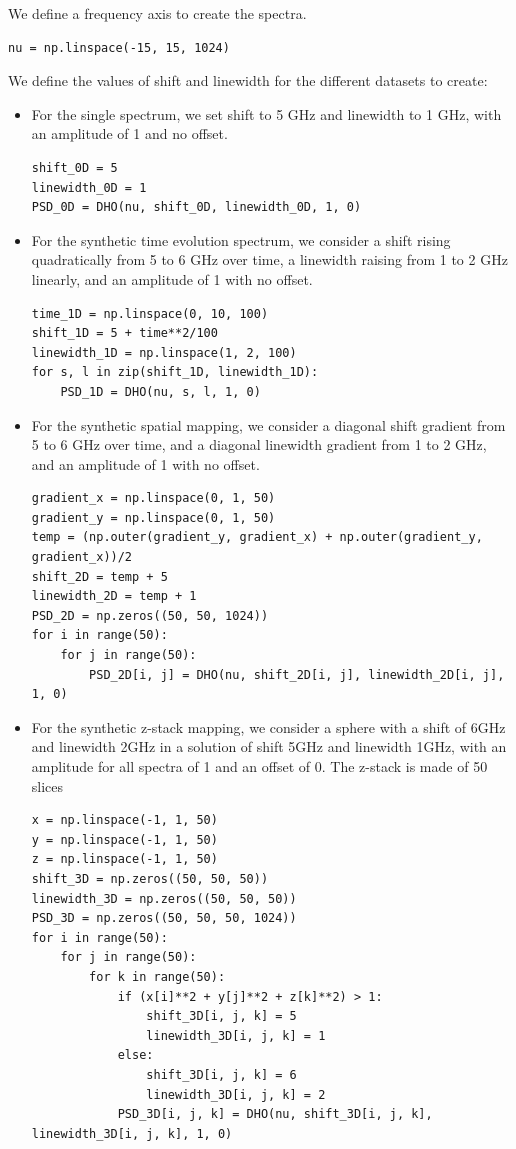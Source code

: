 \documentclass{article}
\begin{document}
We define a frequency axis to create the spectra.

\begin{lstlisting}
nu = np.linspace(-15, 15, 1024)
\end{lstlisting}

We define the values of shift and linewidth for the different datasets to create:
\begin{itemize}
    \item For the single spectrum, we set shift to 5 GHz and linewidth to 1 GHz, with an amplitude of 1 and no offset.
\begin{lstlisting}
shift_0D = 5
linewidth_0D = 1
PSD_0D = DHO(nu, shift_0D, linewidth_0D, 1, 0)
\end{lstlisting}
    \item For the synthetic time evolution spectrum, we consider a shift rising quadratically from 5 to 6 GHz over time, a linewidth raising from 1 to 2 GHz linearly, and an amplitude of 1 with no offset.
\begin{lstlisting}
time_1D = np.linspace(0, 10, 100)
shift_1D = 5 + time**2/100
linewidth_1D = np.linspace(1, 2, 100)
for s, l in zip(shift_1D, linewidth_1D):
    PSD_1D = DHO(nu, s, l, 1, 0)
\end{lstlisting}
    \item For the synthetic spatial mapping, we consider a diagonal shift gradient from 5 to 6 GHz over time, and a diagonal linewidth gradient from 1 to 2 GHz, and an amplitude of 1 with no offset.
\begin{lstlisting}
gradient_x = np.linspace(0, 1, 50)
gradient_y = np.linspace(0, 1, 50)
temp = (np.outer(gradient_y, gradient_x) + np.outer(gradient_y, gradient_x))/2
shift_2D = temp + 5
linewidth_2D = temp + 1 
PSD_2D = np.zeros((50, 50, 1024))
for i in range(50):
    for j in range(50):
        PSD_2D[i, j] = DHO(nu, shift_2D[i, j], linewidth_2D[i, j], 1, 0) 
\end{lstlisting}
    \item For the synthetic z-stack mapping, we consider a sphere with a shift of 6GHz and linewidth 2GHz in a solution of shift 5GHz and linewidth 1GHz, with an amplitude for all spectra of 1 and an offset of 0. The z-stack is made of 50 slices 
\begin{lstlisting}
x = np.linspace(-1, 1, 50)
y = np.linspace(-1, 1, 50)
z = np.linspace(-1, 1, 50)
shift_3D = np.zeros((50, 50, 50))
linewidth_3D = np.zeros((50, 50, 50))
PSD_3D = np.zeros((50, 50, 50, 1024))
for i in range(50):
    for j in range(50):
        for k in range(50):
            if (x[i]**2 + y[j]**2 + z[k]**2) > 1:
                shift_3D[i, j, k] = 5 
                linewidth_3D[i, j, k] = 1 
            else:
                shift_3D[i, j, k] = 6 
                linewidth_3D[i, j, k] = 2 
            PSD_3D[i, j, k] = DHO(nu, shift_3D[i, j, k], linewidth_3D[i, j, k], 1, 0)
\end{lstlisting}
\end{itemize}
\end{document}
